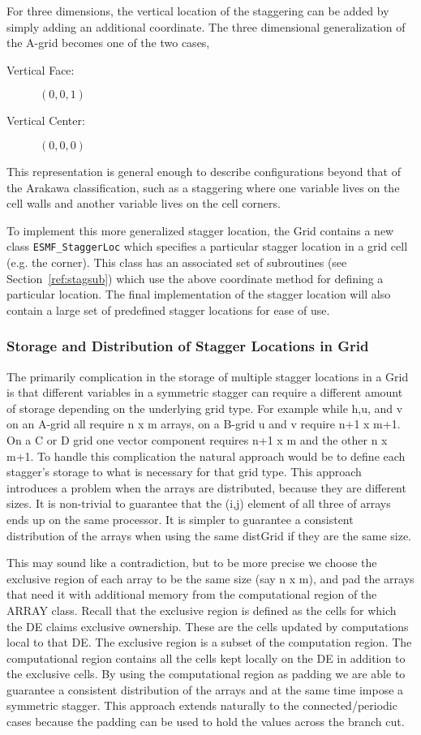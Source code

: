 For three dimensions, the vertical location of the staggering can be added by simply adding an additional coordinate. The three dimensional generalization of the A-grid becomes one of the two cases,
\begin{description}
\item [Vertical Face:] $(0,0,1)$
\item [Vertical Center:] $(0,0,0)$
\end{description}
This representation is general enough to describe configurations beyond that of the Arakawa classification, such as a staggering where one variable lives on the cell walls and another variable lives on the cell corners.

To implement this more generalized stagger location, the Grid contains
a new class {\tt ESMF\_StaggerLoc} which specifies a particular stagger
location in a grid cell (e.g. the corner). This class has an
associated set of subroutines (see Section~\ref{ref:stagsub}) which use
the above coordinate method for defining a particular location. 
The final implementation of the stagger location will also contain a
large set of predefined stagger locations for ease of use. 

\subsubsection{Storage and Distribution of Stagger Locations in Grid}

The primarily complication in the storage of multiple stagger locations in a Grid is that different variables in a symmetric stagger can require a different amount of storage depending on the underlying grid type.  For example while h,u, and v on an A-grid all require n x m arrays, on a B-grid u and v require n+1 x m+1. On a C or D grid one vector component requires n+1 x m and the other n x m+1. To handle this complication the natural approach would be to define each stagger's storage to what is necessary for that grid type. This approach introduces a problem when the arrays are distributed, because they are different sizes. It is non-trivial to guarantee that the (i,j) element of all three of arrays ends up on the same processor. It is simpler to guarantee a consistent distribution of the arrays when using the same distGrid if they are the same size.

This may sound like a contradiction, but to be more precise we choose the exclusive region of each array to be the same size (say n x m), and pad the arrays that need it with additional memory from the computational region of the ARRAY class. Recall that the exclusive region is defined as the cells for which the DE claims exclusive ownership. These are the cells updated by computations local to that DE. The exclusive region is a subset of the computation region. The computational region contains all the cells kept locally on the DE in addition to the exclusive cells. By using the computational region as padding we are able to guarantee a consistent distribution of the arrays and at the same time impose a symmetric stagger. This approach extends naturally to the connected/periodic cases because the padding can be used to hold the values across the branch cut.

